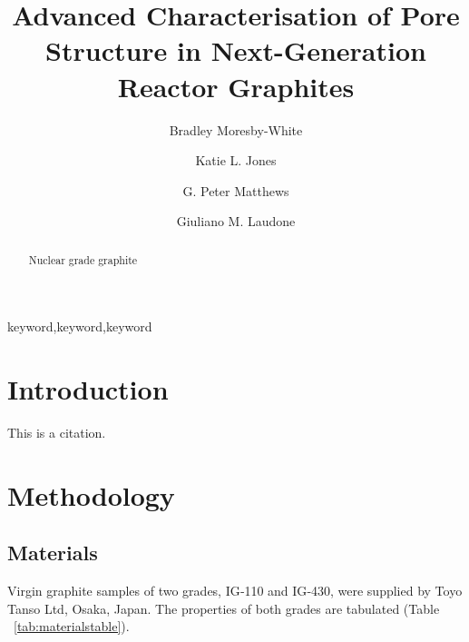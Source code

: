 \documentclass[3p,twocolumn]{elsarticle}
\begin{document}
\begin{frontmatter}
\title{Advanced Characterisation of Pore Structure in Next-Generation Reactor Graphites}
\author[plym]{Bradley Moresby-White}
\author[plym]{Katie L. Jones}
\author[plym]{G. Peter Matthews}
\author[plym]{Giuliano M. Laudone}
\address[plym]{Faculty of Science and Engineering, University of Plymouth, Plymouth, UK}
\begin{abstract}
Nuclear grade graphite
\end{abstract}
\begin{keyword}keyword\sep keyword\sep keyword\end{keyword}
\end{frontmatter}

\section{Introduction}
This is a citation.\cite{JONES2020256HgHe}

\section{Methodology}

\subsection{Materials}

Virgin graphite samples of two grades, IG‑110 and IG‑430, were supplied by
Toyo Tanso Ltd\texttrademark, Osaka, Japan. The properties of both grades are tabulated (Table
~\ref{tab:materialstable}).

\begin{table}[t]
  \centering
  \caption{Manufacturer's characterisation of the graphite types \citep{Jones2018}}
  \label{tab:materialstable}
\end{table}
\end{document}
